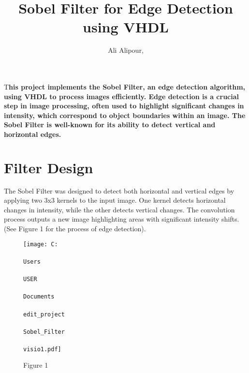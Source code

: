 \documentclass[DIV=calc, paper=a4, fontsize=11pt, twocolumn]{scrartcl}	 %
\title{Sobel Filter for Edge Detection using VHDL} %
\author{Ali Alipour, } %
\date{} %
\newcommand{\initial}[1]{ %
\lettrine[lines=3,lhang=0.3,nindent=0em]{
\color{DarkGoldenrod}
{\textsf{#1}}}{}}
\begin{document}
\maketitle %

\thispagestyle{fancy} %


\initial{T}\textbf{his project implements the Sobel Filter, an edge detection algorithm, 
using VHDL to process images efficiently. Edge detection is a crucial step in image processing, 
often used to highlight significant changes in intensity, which correspond to object boundaries within
 an image. The Sobel Filter is well-known for its ability to detect vertical and horizontal edges.}


\section*{\small{Filter Design}}


The Sobel Filter was designed to detect both horizontal and vertical edges by applying two 3x3 kernels 
to the input image. One kernel detects horizontal changes in intensity, while the other detects vertical 
changes. The convolution process outputs a new image highlighting areas with significant intensity shifts. 
(See Figure 1 for the process of edge detection).

\begin{figure}[htbp]
  \centering
  \texttt{[image: C:\\\\Users\\\\USER\\\\Documents\\\\edit\_project\\\\Sobel\_Filter\\\\visio1.pdf]}
  \caption{Figure 1}
  \label{fig:visio-diagram}
\end{figure}

\end{document}
